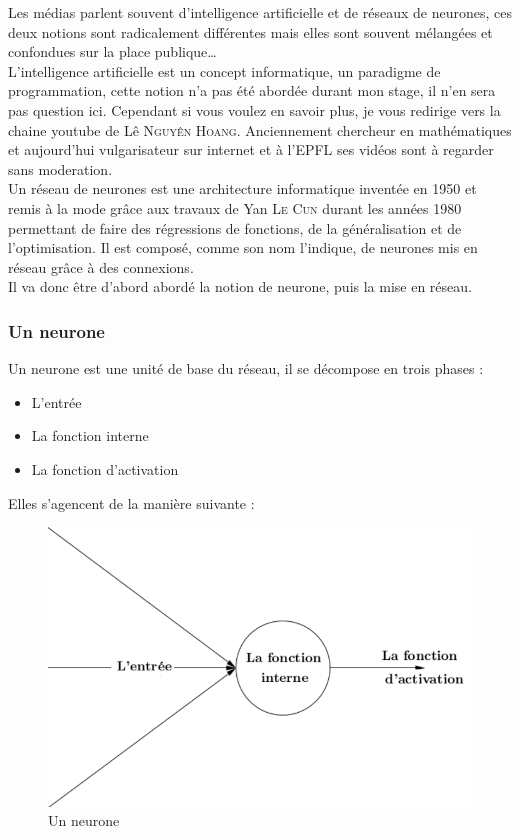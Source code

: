 
Les médias parlent souvent d'intelligence artificielle et de réseaux de neurones,
ces deux notions sont radicalement différentes
mais elles sont souvent mélangées et confondues sur la place publique\ldots \\


L'intelligence artificielle est un concept informatique, un paradigme de programmation,
cette notion n'a pas été abordée durant mon stage, il n'en sera pas question ici.
Cependant si vous voulez en savoir plus, je vous redirige vers la chaine youtube de Lê \textsc{Nguyên Hoang}.
Anciennement chercheur en mathématiques et aujourd'hui vulgarisateur sur internet et à l'\textsc{EPFL}
ses vidéos sont à regarder sans moderation\cite{science4all}. \\


Un réseau de neurones est une architecture informatique inventée en 1950 et remis à la mode grâce aux travaux
de Yan \textsc{Le Cun} durant les années 1980 permettant de faire des régressions de fonctions,
de la généralisation et de l'optimisation.
Il est composé, comme son nom l'indique, de neurones mis en réseau grâce à des connexions.\\
Il va donc être d'abord abordé la notion de neurone, puis la mise en réseau.


\subsubsection{Un neurone}
Un neurone est une unité de base du réseau, il se décompose en trois phases :
\begin{itemize}
    \item L'entrée
    \item La fonction interne
    \item La fonction d'activation
\end{itemize}
\newpage
Elles s'agencent de la manière suivante :
\begin{figure}[H]
    \center
    \includegraphics[height=\moyen]{pict/neurone.png}
	\caption{Un neurone}
    \label{fig:neurone}
\end{figure}


